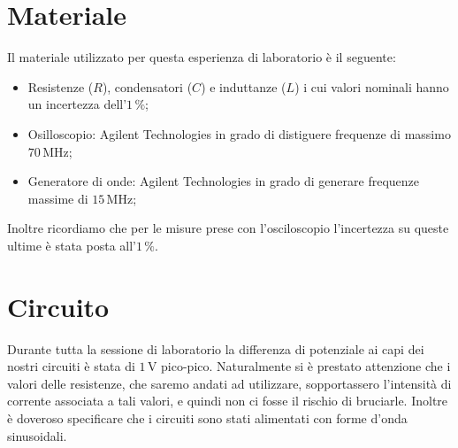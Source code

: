 \section*{Materiale}

Il materiale utilizzato per questa esperienza di laboratorio è il seguente:

\begin{itemize}
	\item{Resistenze ($R$), condensatori ($C$) e induttanze ($L$) i cui valori nominali hanno un incertezza dell'$1\,\%$;}
	\item{Osilloscopio: Agilent Technologies in grado di distiguere frequenze di massimo $70\,\si{\mega\hertz}$;}
	\item{Generatore di onde: Agilent Technologies in grado di generare frequenze massime di $15\,\si{\mega\hertz}$;}
\end{itemize}

Inoltre ricordiamo che per le misure prese con l'osciloscopio l'incertezza su queste ultime è stata posta all'$1\,\%$.

\section*{Circuito}

Durante tutta la sessione di laboratorio la differenza di potenziale ai capi dei nostri circuiti è stata di $1\,\si{\volt}$ pico-pico. Naturalmente si è prestato attenzione che i valori delle resistenze, che saremo andati ad utilizzare, sopportassero l'intensità di corrente associata a tali valori, e quindi non ci fosse il rischio di bruciarle. Inoltre è doveroso specificare che i circuiti sono stati alimentati con forme d'onda sinusoidali.

